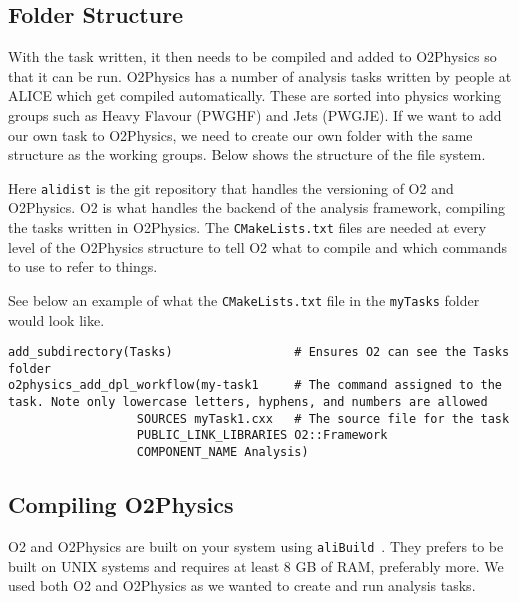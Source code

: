 \subsection{Folder Structure}\label{sec:FolderStructure}
With the task written, it then needs to be compiled and added to O2Physics so that it can be run. O2Physics has a number of analysis tasks written by people at ALICE which get compiled automatically. These are sorted into physics working groups such as Heavy Flavour (PWGHF) and Jets (PWGJE). If we want to add our own task to O2Physics, we need to create our own folder with the same structure as the working groups. Below shows the structure of the file system.


Here \texttt{alidist} is the git repository that handles the versioning of O2 and O2Physics. O2 is what handles the backend of the analysis framework, compiling the tasks written in O2Physics. The \texttt{CMakeLists.txt} files are needed at every level of the O2Physics structure to tell O2 what to compile and which commands to use to refer to things. 

See below an example of what the \texttt{CMakeLists.txt} file in the \texttt{myTasks} folder would look like.

\begin{verbatim}
add_subdirectory(Tasks)                 # Ensures O2 can see the Tasks folder
o2physics_add_dpl_workflow(my-task1     # The command assigned to the task. Note only lowercase letters, hyphens, and numbers are allowed
                  SOURCES myTask1.cxx   # The source file for the task
                  PUBLIC_LINK_LIBRARIES O2::Framework
                  COMPONENT_NAME Analysis)
\end{verbatim}

\subsection{Compiling O2Physics}\label{sec:CompileO2Physics}
O2 and O2Physics are built on your system using \texttt{aliBuild}~\cite{aliBuild_install}. They prefers to be built on UNIX systems and requires at least 8 GB of RAM, preferably more. We used both O2 and O2Physics as we wanted to create and run analysis tasks. 


